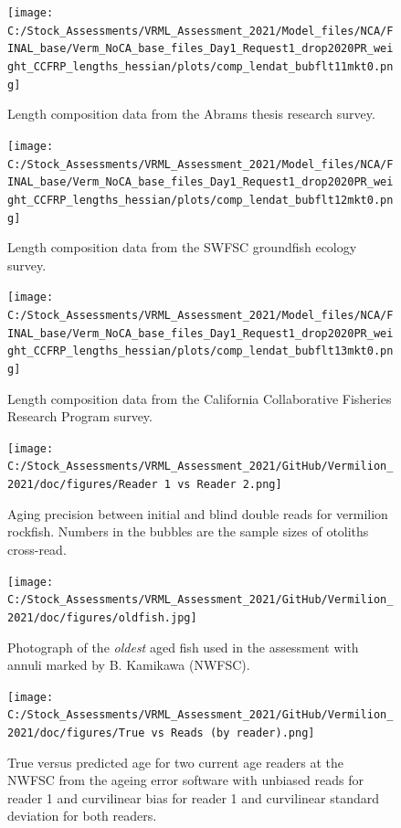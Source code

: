 \documentclass[11pt,
  english,
]{article}
\begin{document}
\begin{figure}
\centering
\texttt{[image: C:/Stock\_Assessments/VRML\_Assessment\_2021/Model\_files/NCA/FINAL\_base/Verm\_NoCA\_base\_files\_Day1\_Request1\_drop2020PR\_weight\_CCFRP\_lengths\_hessian/plots/comp\_lendat\_bubflt11mkt0.png]}
\caption{Length composition data from the Abrams thesis research survey.\label{fig:len-data-ABRAMS-RESEARCH}}
\end{figure}

\begin{figure}
\centering
\texttt{[image: C:/Stock\_Assessments/VRML\_Assessment\_2021/Model\_files/NCA/FINAL\_base/Verm\_NoCA\_base\_files\_Day1\_Request1\_drop2020PR\_weight\_CCFRP\_lengths\_hessian/plots/comp\_lendat\_bubflt12mkt0.png]}
\caption{Length composition data from the SWFSC groundfish ecology survey.\label{fig:len-data-SWFSC-GF-ECOL}}
\end{figure}

\begin{figure}
\centering
\texttt{[image: C:/Stock\_Assessments/VRML\_Assessment\_2021/Model\_files/NCA/FINAL\_base/Verm\_NoCA\_base\_files\_Day1\_Request1\_drop2020PR\_weight\_CCFRP\_lengths\_hessian/plots/comp\_lendat\_bubflt13mkt0.png]}
\caption{Length composition data from the California Collaborative Fisheries Research Program survey.\label{fig:len-data-CCFRP}}
\end{figure}

\begin{figure}
\centering
\texttt{[image: C:/Stock\_Assessments/VRML\_Assessment\_2021/GitHub/Vermilion\_2021/doc/figures/Reader 1 vs Reader 2.png]}
\caption{Aging precision between initial and blind double reads for vermilion rockfish. Numbers in the bubbles are the sample sizes of otoliths cross-read.\label{fig:reader1reader2}}
\end{figure}

\begin{figure}
\centering
\texttt{[image: C:/Stock\_Assessments/VRML\_Assessment\_2021/GitHub/Vermilion\_2021/doc/figures/oldfish.jpg]}
\caption{Photograph of the \emph{oldest} aged fish used in the assessment with annuli marked by B. Kamikawa (NWFSC).\label{fig:oldfish}}
\end{figure}

\begin{figure}
\centering
\texttt{[image: C:/Stock\_Assessments/VRML\_Assessment\_2021/GitHub/Vermilion\_2021/doc/figures/True vs Reads (by reader).png]}
\caption{True versus predicted age for two current age readers at the NWFSC from the ageing error software with unbiased reads for reader 1 and curvilinear bias for reader 1 and curvilinear standard deviation for both readers.\label{fig:truereads}}
\end{figure}
\end{document}
